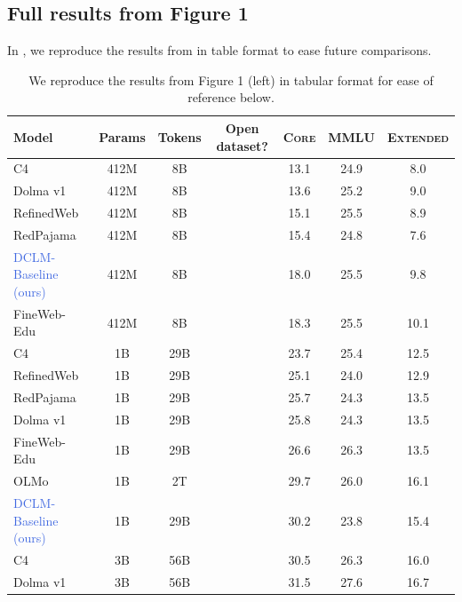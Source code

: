 \documentclass{article}
\newcommand{\cmark}{\ding{51}}
\newcommand{\lowvar}{\textsc{Core}\xspace}
\newcommand{\aggscore}{\textsc{Extended}\xspace}
\begin{document}
\subsection{Full results from Figure 1}

In , we reproduce the results from  in table format to ease future comparisons.

\begin{table}
    \centering
    \caption{We reproduce the results from Figure 1 (left) in tabular format for ease of reference below.}
\begingroup
\renewcommand{\arraystretch}{1.2}
\begin{tabular}{lcccccc}
\toprule
Model & Params & Tokens & Open dataset? & \lowvar & MMLU & \aggscore \\
\midrule
C4 & 412M & 8B & \textcolor{nicergreen}{\cmark} & 13.1 & 24.9 & 8.0 \\
Dolma v1 & 412M & 8B & \textcolor{nicergreen}{\cmark} & 13.6 & 25.2 & 9.0 \\
RefinedWeb & 412M & 8B & \textcolor{nicergreen}{\cmark} & 15.1 & 25.5 & 8.9 \\
RedPajama & 412M & 8B & \textcolor{nicergreen}{\cmark} & 15.4 & 24.8 & 7.6 \\
\textcolor{RoyalBlue}{DCLM-Baseline (ours)} & 412M & 8B & \textcolor{nicergreen}{\cmark} & 18.0 & 25.5 & 9.8 \\
FineWeb-Edu & 412M & 8B & \textcolor{nicergreen}{\cmark} & 18.3 & 25.5 & 10.1 \\
C4 & 1B & 29B & \textcolor{nicergreen}{\cmark} & 23.7 & 25.4 & 12.5 \\
RefinedWeb & 1B & 29B & \textcolor{nicergreen}{\cmark} & 25.1 & 24.0 & 12.9 \\
RedPajama & 1B & 29B & \textcolor{nicergreen}{\cmark} & 25.7 & 24.3 & 13.5 \\
Dolma v1 & 1B & 29B & \textcolor{nicergreen}{\cmark} & 25.8 & 24.3 & 13.5 \\
FineWeb-Edu & 1B & 29B & \textcolor{nicergreen}{\cmark} & 26.6 & 26.3 & 13.5 \\
OLMo & 1B & 2T & \textcolor{nicergreen}{\cmark} & 29.7 & 26.0 & 16.1 \\
\textcolor{RoyalBlue}{DCLM-Baseline (ours)} & 1B & 29B & \textcolor{nicergreen}{\cmark} & 30.2 & 23.8 & 15.4 \\
C4 & 3B & 56B & \textcolor{nicergreen}{\cmark} & 30.5 & 26.3 & 16.0 \\
Dolma v1 & 3B & 56B & \textcolor{nicergreen}{\cmark} & 31.5 & 27.6 & 16.7 \\

\end{tabular}
\end{table}
\end{document}
